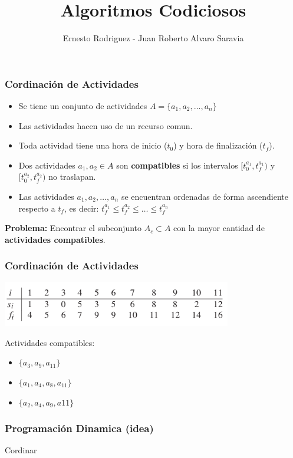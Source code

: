 \documentclass{beamer}
\title[Codiciosos]{Algoritmos Codiciosos}
\author{Ernesto Rodriguez - Juan Roberto Alvaro Saravia}
\institute{
    Universidad Francisco Marroquin \\
    \medskip \textit{ernestorodriguez@ufm.edu - juanalvarado@ufm.edu}
}
\date[\today]{}
\begin{document}
\begin{frame}
\titlepage
\end{frame}

\begin{frame}
\frametitle{Cordinaci\'on de Actividades}
\begin{itemize}
\item{Se tiene un conjunto de actividades $A=\{a_1,a_2,\ldots,a_n\}$}
\item{Las actividades hacen uso de un recurso comun.}
\item{Toda actividad tiene una hora de inicio ($t_0$) y
    hora de finalizaci\'on ($t_f$).}
\item{Dos actividades $a_1,a_2\in A$ son {\bf compatibles} si
    los intervalos $[t_0^{a_1},t_f^{a_1})$ y $[t_0^{a_2},t_f^{a_2})$
    no traslapan.}
\item{Las actividades $a_1,a_2,\ldots,a_n$ se encuentran ordenadas
    de forma ascendiente respecto a $t_f$, es decir: $t_f^{a_1}\leq
    t_f^{a_2}\leq\ldots\leq t_f^{a_n}$}
\end{itemize}
{\bf Problema: } Encontrar el subconjunto $A_c\subset A$ con la
mayor cantidad de {\bf actividades compatibles}.
\end{frame}

\begin{frame}
\frametitle{Cordinaci\'on de Actividades}
\begin{center}
    \includegraphics[width=10cm]{./actividades.png}
\end{center}
Actividades compatibles:\\
\begin{itemize}
    \item{$\{a_3,a_9,a_{11}\}$}
    \item{$\{a_1,a_4,a_8,a_{11}\}$}
    \item{$\{a_2,a_4,a_9,a{11}\}$}
\end{itemize}
\end{frame}

\begin{frame}
\frametitle{Programaci\'on Dinamica (idea)}
\begin{algorithm}[H]
    \caption{Cordinar}
    \begin{algorithmic}[1]
        \If{$[t_0^{a_i},t_f^{a_i})\subseteq [t_0,t_f)$}
        \EndIf
    \EndFor
    \EndProcedure
    \end{algorithmic}
\end{algorithm}
\end{frame}
\end{document}
